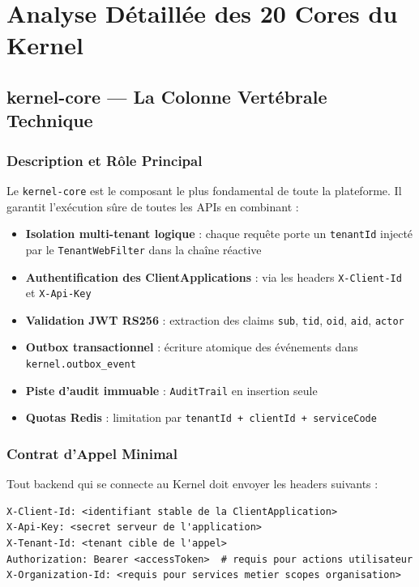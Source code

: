 \documentclass[12pt,a4paper]{report}
\begin{document}
\chapter{Analyse Détaillée des 20 Cores du Kernel}

\section{kernel-core — La Colonne Vertébrale Technique}

\subsection{Description et Rôle Principal}

Le \texttt{kernel-core} est le composant le plus fondamental de toute la plateforme. Il garantit l'exécution sûre de toutes les APIs en combinant :

\begin{itemize}[leftmargin=2cm]
  \item \textbf{Isolation multi-tenant logique} : chaque requête porte un \texttt{tenantId} injecté par le \texttt{TenantWebFilter} dans la chaîne réactive
  \item \textbf{Authentification des ClientApplications} : via les headers \texttt{X-Client-Id} et \texttt{X-Api-Key}
  \item \textbf{Validation JWT RS256} : extraction des claims \texttt{sub}, \texttt{tid}, \texttt{oid}, \texttt{aid}, \texttt{actor}
  \item \textbf{Outbox transactionnel} : écriture atomique des événements dans \texttt{kernel.outbox\_event}
  \item \textbf{Piste d'audit immuable} : \texttt{AuditTrail} en insertion seule
  \item \textbf{Quotas Redis} : limitation par \texttt{tenantId + clientId + serviceCode}
\end{itemize}

\subsection{Contrat d'Appel Minimal}

Tout backend qui se connecte au Kernel doit envoyer les headers suivants :

\begin{lstlisting}[style=yamlStyle, caption={Headers obligatoires vers le Kernel}]
X-Client-Id: <identifiant stable de la ClientApplication>
X-Api-Key: <secret serveur de l'application>
X-Tenant-Id: <tenant cible de l'appel>
Authorization: Bearer <accessToken>  # requis pour actions utilisateur
X-Organization-Id: <requis pour services metier scopes organisation>
\end{lstlisting}
\end{document}
